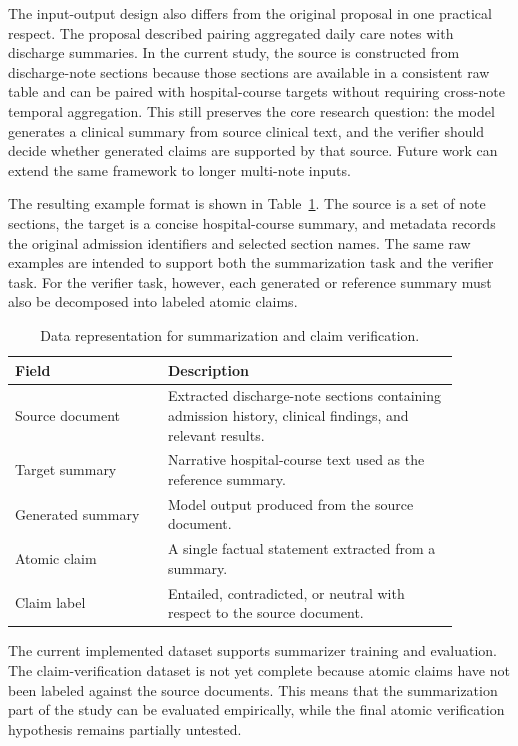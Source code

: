 \documentclass[11pt]{article}
\begin{document}
The input-output design also differs from the original proposal in one practical respect. The proposal described pairing aggregated daily care notes with discharge summaries. In the current study, the source is constructed from discharge-note sections because those sections are available in a consistent raw table and can be paired with hospital-course targets without requiring cross-note temporal aggregation. This still preserves the core research question: the model generates a clinical summary from source clinical text, and the verifier should decide whether generated claims are supported by that source. Future work can extend the same framework to longer multi-note inputs.

The resulting example format is shown in Table~\ref{tab:dataset}. The source is a set of note sections, the target is a concise hospital-course summary, and metadata records the original admission identifiers and selected section names. The same raw examples are intended to support both the summarization task and the verifier task. For the verifier task, however, each generated or reference summary must also be decomposed into labeled atomic claims.

\begin{table}[t]
\small
\centering
\begin{tabular}{@{}p{0.30\linewidth}p{0.58\linewidth}@{}}
\toprule
Field & Description \\ \midrule
Source document & Extracted discharge-note sections containing admission history, clinical findings, and relevant results. \\
Target summary & Narrative hospital-course text used as the reference summary. \\
Generated summary & Model output produced from the source document. \\
Atomic claim & A single factual statement extracted from a summary. \\
Claim label & Entailed, contradicted, or neutral with respect to the source document. \\ \bottomrule
\end{tabular}
\caption{Data representation for summarization and claim verification.}
\label{tab:dataset}
\end{table}

The current implemented dataset supports summarizer training and evaluation. The claim-verification dataset is not yet complete because atomic claims have not been labeled against the source documents. This means that the summarization part of the study can be evaluated empirically, while the final atomic verification hypothesis remains partially untested.
\end{document}
